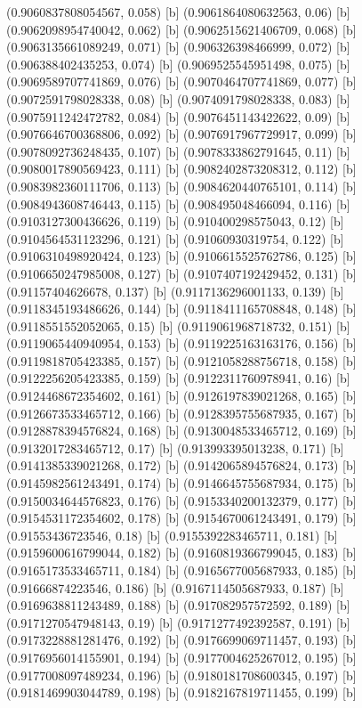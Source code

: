 {{{(0.9060837808054567, 0.058) [b] 
(0.9061864080632563, 0.06) [b] 
(0.9062098954740042, 0.062) [b] 
(0.9062515621406709, 0.068) [b] 
(0.9063135661089249, 0.071) [b] 
(0.906326398466999, 0.072) [b] 
(0.906388402435253, 0.074) [b] 
(0.9069525545951498, 0.075) [b] 
(0.9069589707741869, 0.076) [b] 
(0.9070464707741869, 0.077) [b] 
(0.9072591798028338, 0.08) [b] 
(0.9074091798028338, 0.083) [b] 
(0.9075911242472782, 0.084) [b] 
(0.9076451143422622, 0.09) [b] 
(0.9076646700368806, 0.092) [b] 
(0.9076917967729917, 0.099) [b] 
(0.9078092736248435, 0.107) [b] 
(0.9078333862791645, 0.11) [b] 
(0.9080017890569423, 0.111) [b] 
(0.9082402873208312, 0.112) [b] 
(0.9083982360111706, 0.113) [b] 
(0.9084620440765101, 0.114) [b] 
(0.9084943608746443, 0.115) [b] 
(0.908495048466094, 0.116) [b] 
(0.9103127300436626, 0.119) [b] 
(0.910400298575043, 0.12) [b] 
(0.9104564531123296, 0.121) [b] 
(0.91060930319754, 0.122) [b] 
(0.9106310498920424, 0.123) [b] 
(0.9106615525762786, 0.125) [b] 
(0.9106650247985008, 0.127) [b] 
(0.9107407192429452, 0.131) [b] 
(0.91157404626678, 0.137) [b] 
(0.9117136296001133, 0.139) [b] 
(0.9118345193486626, 0.144) [b] 
(0.9118411165708848, 0.148) [b] 
(0.9118551552052065, 0.15) [b] 
(0.9119061968718732, 0.151) [b] 
(0.9119065440940954, 0.153) [b] 
(0.9119225163163176, 0.156) [b] 
(0.9119818705423385, 0.157) [b] 
(0.9121058288756718, 0.158) [b] 
(0.9122256205423385, 0.159) [b] 
(0.9122311760978941, 0.16) [b] 
(0.9124468672354602, 0.161) [b] 
(0.9126197839021268, 0.165) [b] 
(0.9126673533465712, 0.166) [b] 
(0.9128395755687935, 0.167) [b] 
(0.9128878394576824, 0.168) [b] 
(0.9130048533465712, 0.169) [b] 
(0.9132017283465712, 0.17) [b] 
(0.913993395013238, 0.171) [b] 
(0.9141385339021268, 0.172) [b] 
(0.9142065894576824, 0.173) [b] 
(0.9145982561243491, 0.174) [b] 
(0.9146645755687934, 0.175) [b] 
(0.9150034644576823, 0.176) [b] 
(0.9153340200132379, 0.177) [b] 
(0.9154531172354602, 0.178) [b] 
(0.9154670061243491, 0.179) [b] 
(0.91553436723546, 0.18) [b] 
(0.9155392283465711, 0.181) [b] 
(0.9159600616799044, 0.182) [b] 
(0.9160819366799045, 0.183) [b] 
(0.9165173533465711, 0.184) [b] 
(0.9165677005687933, 0.185) [b] 
(0.91666874223546, 0.186) [b] 
(0.9167114505687933, 0.187) [b] 
(0.9169638811243489, 0.188) [b] 
(0.917082957572592, 0.189) [b] 
(0.9171270547948143, 0.19) [b] 
(0.9171277492392587, 0.191) [b] 
(0.9173228881281476, 0.192) [b] 
(0.9176699069711457, 0.193) [b] 
(0.9176956014155901, 0.194) [b] 
(0.9177004625267012, 0.195) [b] 
(0.9177008097489234, 0.196) [b] 
(0.9180181708600345, 0.197) [b] 
(0.9181469903044789, 0.198) [b] 
(0.9182167819711455, 0.199) [b] 
}}}
